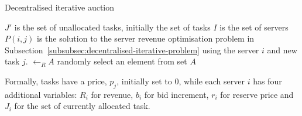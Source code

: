 
\begin{algorithm}
    \caption{Decentralised iterative auction}
    \label{alg:decentralised-iterative-auction}
    \begin{algorithmic}
        \REQUIRE $J'$ is the set of unallocated tasks, initially the set of tasks
        \REQUIRE $I$ is the set of servers
        \REQUIRE $P(i, j)$ is the solution to the server revenue optimisation problem in Subsection~\ref{subsubsec:decentralised-iterative-problem} using the server $i$ and new task $j$. 
        \REQUIRE $\leftarrow_R A$ randomly select an element from set $A$
        
                \ENDIF
            \ENDFOR
            \ENDIF
        \ENDWHILE
    \end{algorithmic}
\end{algorithm}

Formally, tasks have a price, $p_j$, initially set to 0, while each server $i$ has four additional variables: $R_i$ for revenue, $b_i$ for bid increment, $r_i$ for reserve price and $J_i$ for the set of currently allocated task. 

